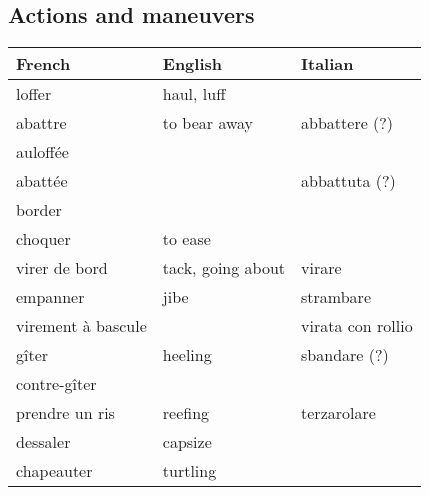\documentclass[a4paper, 12pt, twoside]{article}
\begin{document}
    \begin{indt}{\section{Actions and maneuvers}} %
        \begin{tabular}{|l|l|l|}
            \hline %
            \textbf{French}
            & \textbf{English}
            & \textbf{Italian}
            \\
            \hline
            \hline %
            loffer %
            & haul, luff
            &
            \\
            \hline %
            abattre %
            & to bear away
            & abbattere (?)
            \\
            \hline %
            auloffée %
            &
            &
            \\
            \hline %
            abattée %
            &
            & abbattuta (?)
            \\
            \hline %
            border %
            &
            &
            \\
            \hline %
            choquer %
            & to ease
            &
            \\
            \hline %
            virer de bord %
            & tack, going about
            & virare
            \\
            \hline %
            empanner %
            & jibe
            & strambare
            \\
            \hline %
            virement à bascule %
            &
            & virata con rollio
            \\
            \hline %
            gîter %
            & heeling
            & sbandare (?)
            \\
            \hline %
            contre-gîter %
            &
            &
            \\
            \hline %
            prendre un ris %
            & reefing
            & terzarolare
            \\
            \hline %
            dessaler %
            & capsize
            &
            \\
            \hline %
            chapeauter %
            & turtling 
            &
            \\

\end{tabular}
\end{indt}
\end{document}
